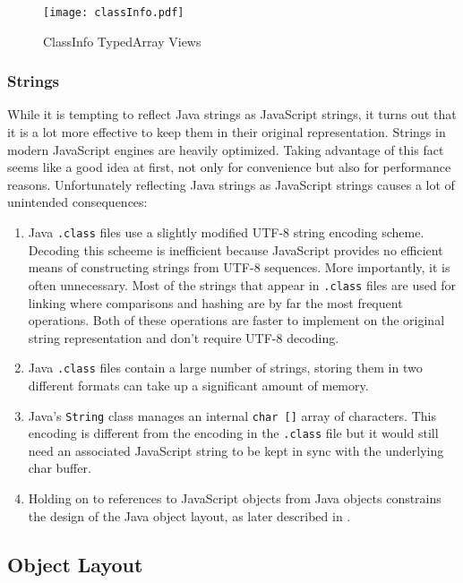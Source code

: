 \documentclass{acm_proc_article-sp}
\begin{document}
\begin{figure}[htbp]
\begin{center}
\texttt{[image: classInfo.pdf]}
\caption{ClassInfo TypedArray Views}
\label{default}
\end{center}
\end{figure}

\subsubsection{Strings}

While it is tempting to reflect Java strings as JavaScript strings, it turns out that it is a lot more effective to keep them in their original representation.
Strings in modern JavaScript engines are heavily optimized.
Taking advantage of this fact seems like a good idea at first, not only for convenience but also for performance reasons.
Unfortunately reflecting Java strings as JavaScript strings causes a lot of unintended consequences:

\begin{enumerate}
\item Java \texttt{.class} files use a slightly modified UTF-8 string encoding scheme.
Decoding this scheeme is inefficient because JavaScript provides no efficient means of constructing strings from UTF-8 sequences.
More importantly, it is often unnecessary.
Most of the strings that appear in \texttt{.class} files are used for linking where comparisons and hashing are by far the most frequent operations.
Both of these operations are faster to implement on the original string representation and don't require UTF-8 decoding.
\item Java \texttt{.class} files contain a large number of strings, storing them in two different formats can take up a significant amount of memory.
\item Java's \texttt{String} class manages an internal \texttt{char []} array of characters.
This encoding is different from the encoding in the \texttt{.class} file but it would still need an associated JavaScript string to be kept in sync with the underlying char buffer.
\item Holding on to references to JavaScript objects from Java objects constrains the design of the Java object layout, as later described in .
\end{enumerate}

\subsection{Object Layout} \label{sec:objectLayout}
\end{document}
